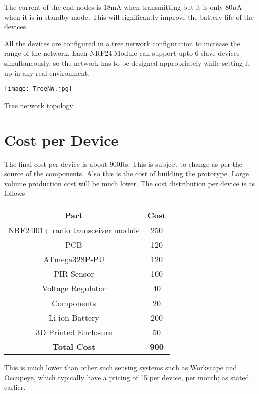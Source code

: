 The current of the end nodes is 18mA when transmitting but it is only 80$\mu$A when it is in standby mode. This will significantly improve the battery life of the devices.

All the devices are configured in a tree network configuration to increase the range of the network. Each NRF24 Module can support upto 6 slave devices simultaneously, so the network has to be designed appropriately while setting it up in any real environment.

\vspace{10pt}
\begin{center}
	\texttt{[image: TreeNW.jpg]}
	
	Tree network topology
\end{center}

\pagebreak

\section{Cost per Device}

The final cost per device is about 900Rs. This is subject to change as per the source of the components. Also this is the cost of building the prototype. Large volume production cost will be much lower.
The cost distribution per device is as follows
\\
\begin{center}
	\begin{tabular}{|c|c|}
		\hline
		\textbf{Part} & \textbf{Cost}	\\			\hline
		NRF24l01+ radio transceiver module & 250 \\	\hline
		PCB & 120 \\								\hline
		ATmega328P-PU &120 \\						\hline
		PIR Sensor & 100 \\							\hline
		Voltage Regulator & 40 \\					\hline
		Components & 20 \\							\hline
		Li-ion Battery & 200 \\						\hline
		3D Printed Enclosure & 50 \\				\hline
		\textbf{Total Cost}& \textbf{900} \\		\hline
	\end{tabular}
\end{center}

This is much lower than other such sensing systems such as Workscape\cite{workscape} and Occupeye\cite{occupeye}, which typically have a pricing of 15\textdollar \hspace{1pt} per device, per month; as stated earlier.


